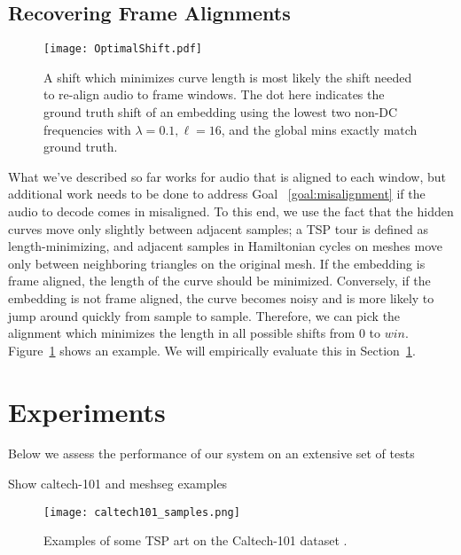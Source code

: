 \documentclass[runningheads]{llncs}
\begin{document}
\subsection{Recovering Frame Alignments}
\label{sec:framealignments}

\begin{figure}
  \centering
  \texttt{[image: OptimalShift.pdf]}
  \caption{A shift which minimizes curve length is most likely the shift needed to re-align audio to frame windows.  The dot here indicates the ground truth shift of an embedding using the lowest two non-DC frequencies with $\lambda=0.1, \ell=16$, and the global mins exactly match ground truth.}
  \label{fig:FrameAlignments}
\end{figure}

What we've described so far works for audio that is aligned to each window, but additional work needs to be done to address Goal ~\ref{goal:misalignment} if the audio to decode comes in misaligned.  To this end, we use the fact that the hidden curves move only slightly between adjacent samples; a TSP tour is defined as length-minimizing, and adjacent samples in Hamiltonian cycles on meshes move only between neighboring triangles on the original mesh.  If the embedding is frame aligned, the length of the curve should be minimized.  Conversely, if the embedding is not frame aligned, the curve becomes noisy and is more likely to jump around quickly from sample to sample.  Therefore, we can pick the alignment which minimizes the length in all possible shifts from $0$ to $win$.  Figure~\ref{fig:FrameAlignments} shows an example.  We will empirically evaluate this in Section~\ref{sec:experiments}.





\section{Experiments}
\label{sec:experiments}

Below we assess the performance of our system on an extensive set of tests

Show caltech-101 and meshseg examples

\begin{figure}
  \centering
  \texttt{[image: caltech101\_samples.png]}
  \caption{Examples of some TSP art on the Caltech-101 dataset \cite{li_andreeto_ranzato_perona_2022}.}
  \label{fig:caltech101examples}
\end{figure}
\end{document}
